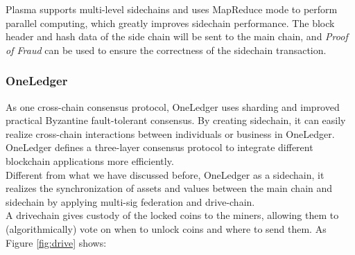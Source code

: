 \noindent Plasma supports multi-level sidechains and uses MapReduce mode to perform parallel computing, which greatly improves sidechain performance. The block header and hash data of the side chain will be sent to the main chain, and \textit{Proof of Fraud} can be used to ensure the correctness of the sidechain transaction.


\subsubsection{OneLedger}
\noindent As one cross-chain consensus protocol, OneLedger\cite{Oneledger} uses sharding and improved practical Byzantine fault-tolerant consensus. By creating sidechain, it can easily realize cross-chain interactions between individuals or business in OneLedger. OneLedger defines a three-layer consensus protocol to integrate different blockchain applications more efficiently.\\
\noindent Different from what we have discussed before, OneLedger as a sidechain, it realizes the synchronization of assets and values between the main chain and sidechain by applying multi-sig federation and drive-chain.\\
\noindent A drivechain\cite{lerner2016drivechains} gives custody of the locked coins to the miners, allowing them to (algorithmically) vote on when to unlock coins and where to send them. As Figure \ref{fig:drive} shows:

